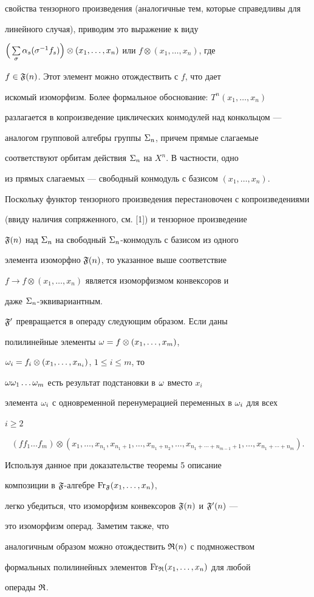 \begin{pf}
свойства тензорного произведения (аналогичные тем, которые справедливы для


линейного случая), приводим это выражение к виду


$\Big(\sum\limits_{\s} \al_s (\s^{-1}f_s)\Big)\otimes


(x_{1},\dotsc,x_{n})$ или $f\otimes (x_{1},\dotsc,x_{n})$, где


$f\in \frak F(n)$. Этот элемент можно отождествить с $f$, что дает


искомый изоморфизм. Более формальное обоснование: $T^n({x_1,\dotsc, x_n})$


разлагается в копроизведение циклических конмодулей над конкольцом ---


аналогом групповой алгебры группы $\Sigma_n$, причем прямые слагаемые


соответствуют орбитам действия $\Sigma_n$ на $X^n$. В частности, одно


из прямых слагаемых --- свободный конмодуль с базисом $(x_1,\dotsc,x_n)$.


Поскольку функтор тензорного произведения перестановочен с копроизведениями


(ввиду наличия сопряженного, см. [1]) и тензорное произведение


$\frak F(n)$ над $\Sigma_n$ на свободный $\Sigma_n$-конмодуль с базисом из одного


элемента изоморфно $\frak F(n)$, то указанное выше соответствие


$f \to f\otimes (x_1,\dotsc, x_n)$ является изоморфизмом конвексоров и


даже $\Sigma_n$-эквивариантным.


$\frak F'$ превращается в операду следующим образом. Если даны


полилинейные элементы $\omega=f\otimes (x_1,\dotsc,x_m)$,


$\omega_i=f_i\otimes (x_1,\dotsc, x_{n_i})$, $1\le i \le m$, то


$\omega\omega_1\dotsc\omega_m$ есть результат подстановки в $\omega$ вместо $x_i$


элемента $\omega_i$ с одновременной перенумерацией переменных в $\omega_i$ для всех


$i\ge 2$


$$


(f f_1\dotsc f_m)\otimes (x_1,\dotsc,x_{n_1},x_{n_1+1},\dotsc,x_{n_1+n_2},


\dotsc,x_{n_1+\dotsb+n_{m-1}+1},\dotsc, x_{n_1+\dotsb+n_m}).


$$


Используя данное при доказательстве теоремы 5 описание


композиции в $\frak F$-алгебре $\operatorname{Fr}_{\frak F}(x_1,\dotsc,x_n)$,


легко убедиться, что изоморфизм конвексоров $\frak F(n)$ и $\frak F'(n)$ ---


это изоморфизм операд. Заметим также, что


аналогичным образом можно отождествить $\frak R(n)$ с подмножеством


формальных полилинейных элементов $\operatorname{Fr}_{\frak R}(x_1,\dotsc,x_n)$ для любой


операды $\frak R$.


\end{pf}
